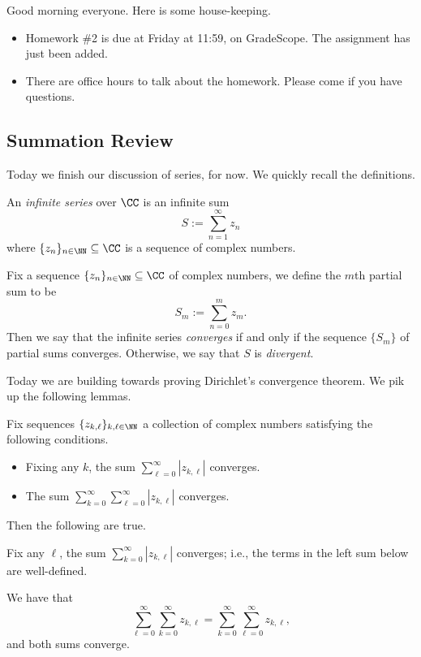 
Good morning everyone. Here is some house-keeping.
\begin{itemize}
	\item Homework \#2 is due at Friday at 11:59, on GradeScope. The assignment has just been added.
	\item There are office hours to talk about the homework. Please come if you have questions.
\end{itemize}

\subsection{Summation Review}
Today we finish our discussion of series, for now. We quickly recall the definitions.
\begin{definition}[Series]
	An \textit{infinite series} over $\CC$ is an infinite sum
	\[S:=\sum_{n=1}^\infty z_n\]
	where $\{z_n\}_{n\in\NN}\subseteq\CC$ is a sequence of complex numbers.
\end{definition}
\begin{definition}
	Fix a sequence $\{z_n\}_{n\in\NN}\subseteq\CC$ of complex numbers, we define the $m$th partial sum to be
	\[S_m:=\sum_{n=0}^mz_m.\]
	Then we say that the infinite series \textit{converges} if and only if the sequence $\{S_m\}$ of partial sums converges. Otherwise, we say that $S$ is \textit{divergent}.
\end{definition}
Today we are building towards proving Dirichlet's convergence theorem. We pik up the following lemmas.
\begin{lemma}
	Fix sequences $\{z_{k,\ell}\}_{k,\ell\in\NN}$ a collection of complex numbers satisfying the following conditions.
	\begin{itemize}
		\item Fixing any $k$, the sum $\sum_{\ell=0}^\infty|z_{k,\ell}|$ converges.
		\item The sum $\sum_{k=0}^\infty\sum_{\ell=0}^\infty|z_{k,\ell}|$ converges.
	\end{itemize}
	Then the following are true.
	\begin{listalph}
		\item Fix any $\ell$, the sum $\sum_{k=0}^\infty|z_{k,\ell}|$ converges; i.e., the terms in the left sum below are well-defined.
		\item We have that
		\[\sum_{\ell=0}^\infty\sum_{k=0}^\infty z_{k,\ell}=\sum_{k=0}^\infty\sum_{\ell=0}^\infty z_{k,\ell},\]
		and both sums converge.
	\end{listalph}
\end{lemma}
